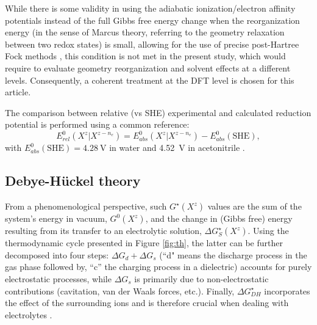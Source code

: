 \documentclass[review,preprint]{elsarticle}
\begin{document}
While there is some validity in using the adiabatic ionization/electron affinity potentials instead of the full Gibbs free energy change when the reorganization energy (in the sense of Marcus theory, referring to the geometry relaxation between two redox states) is small, allowing for the use of precise post-Hartree Fock methods  \cite{namazianBenchmarkCalculationsAbsolute2010,marenichComputationalElectrochemistryPrediction2014,makosModelingAbsoluteRedox2022}, this condition is not met in the present study, which would require to evaluate geometry reorganization and solvent effects at a different levels. Consequently, a coherent treatment at the DFT level is chosen for this article.


The comparison between relative (vs SHE) experimental and calculated reduction potential is performed using a common reference:\begin{equation}
	E^0_{rel}(X^z|X^{z-n_e})  = E^0_{abs}(X^z|X^{z-n_e}) - E^{0}_{abs}(\text{SHE}), \label{eq:ecalc}
\end{equation}
with $E^0_{abs}(\text{SHE}) = \SI{4.28}{\volt}$ in water and \SI{4.52}{\volt} in acetonitrile \cite{marenichComputationalElectrochemistryPrediction2014}.


\subsection{Debye-Hückel theory}

From a phenomenological perspective, such $G^\star(X^z)$ values are the sum of the system's energy in vacuum, $G^0(X^z)$, and the change in (Gibbs free) energy resulting from its transfer to an electrolytic solution, $\Delta G_S^\star(X^z)$. Using the thermodynamic cycle presented in Figure \ref{fig:th}, the latter can be further decomposed into four steps: $\Delta G_d + \Delta G_s$ (``d" means the discharge process in the gas phase followed by,  ``c'' the charging process in a dielectric) accounts for purely electrostatic processes, while $\Delta G_s$ is primarily due to non-electrostatic contributions (cavitation, van der Waals forces, etc.). Finally, $\Delta G^\star_{DH}$ incorporates the effect of the surrounding ions and is therefore crucial when dealing with electrolytes \cite{silvaImprovingBornEquation2024}.
\end{document}
